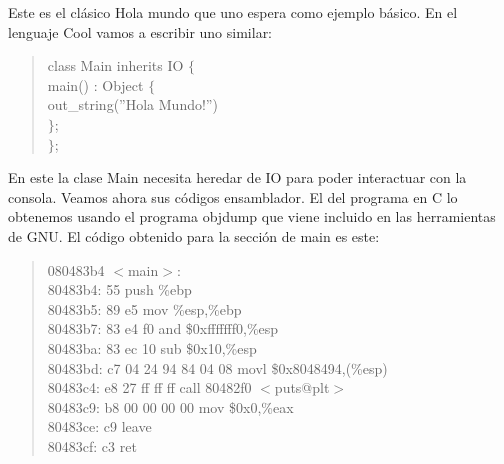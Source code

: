 \documentclass[10pt,a4paper]{article}
\begin{document}
Este es el clásico Hola mundo que uno espera como ejemplo básico. En el lenguaje Cool vamos a escribir uno similar:
\begin{quote}
class Main inherits IO $\lbrace$\\
\- main() : Object $\lbrace$\\ 
\-\- out\_string(''Hola Mundo!'') \\
\-$\rbrace$;\\
$\rbrace$;\\
\end{quote}

En este la clase Main necesita heredar de IO para poder interactuar con la consola. Veamos ahora sus códigos ensamblador. El del programa en C lo obtenemos usando el programa objdump que viene incluido en las herramientas de GNU. El código obtenido para la sección de main es este:

\begin{quote}
080483b4 $<$main$>$:\\
80483b4: \hspace{0.25cm} 55 \hspace{0.25cm} push   \%ebp\\
 80483b5: \hspace{0.25cm} 89 e5 \hspace{0.25cm} mov    \%esp,\%ebp\\
 80483b7: \hspace{0.25cm} 83 e4 f0             	\hspace{0.25cm}and    \$0xfffffff0,\%esp\\
 80483ba: \hspace{0.25cm} 83 ec 10             	\hspace{0.25cm}sub    \$0x10,\%esp\\
 80483bd: \hspace{0.25cm} c7 04 24 94 84 04 08 	\hspace{0.25cm}movl   \$0x8048494,(\%esp)\\
 80483c4: \hspace{0.25cm} e8 27 ff ff ff       	\hspace{0.25cm}call   80482f0 $<$puts@plt$>$\\
 80483c9: \hspace{0.25cm} b8 00 00 00 00       	\hspace{0.25cm}mov    \$0x0,\%eax\\
 80483ce: \hspace{0.25cm} c9                   	\hspace{0.25cm}leave \\ 
 80483cf: \hspace{0.25cm} c3                   	\hspace{0.25cm}ret\\  
\end{quote}
\end{document}
